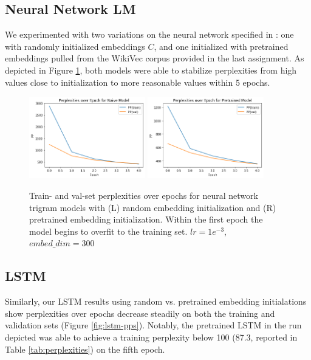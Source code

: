\documentclass[11pt]{article}
\begin{document}
\subsection{Neural Network LM}

We experimented with two variations on the neural network specified in \cite{bengio2003neural}: one with randomly initialized embeddings $C$, and one initialized with pretrained embeddings pulled from the WikiVec corpus provided in the last assignment. As depicted in Figure \ref{fig:nn-pps}, both models were able to stabilize perplexities from high values close to initialization to more reasonable values within 5 epochs.

\begin{figure}[h]
  \centering
  \includegraphics[width=0.45\textwidth]{figures/nn_naive_pp.png}
  \includegraphics[width=0.45\textwidth]{figures/nn_pretrained_pp.png}
  \caption{Train- and val-set perplexities over epochs for neural network trigram models with (L) random embedding initialization and (R) pretrained embedding initialization. Within the first epoch the model begins to overfit to the training set. $lr=1e^{-3}$, $embed\_dim=300$}
  \label{fig:nn-pps}
\end{figure}

\subsection{LSTM}

Similarly, our LSTM results using random vs. pretrained embedding initialations show perplexities over epochs decrease steadily on both the training and validation sets (Figure \ref{fig:lstm-pps}). Notably, the pretrained LSTM in the run depicted was able to achieve a training perplexity below 100 (87.3, reported in Table \ref{tab:perplexities}) on the fifth epoch.
\end{document}
